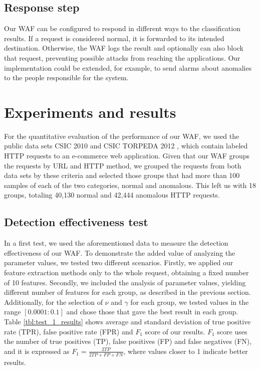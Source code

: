 \subsection{Response step}

Our WAF can be configured to respond in different ways to the classification
results. If a request is considered normal, it is forwarded to its intended
destination. Otherwise, the WAF logs the result and optionally can also
block that request, preventing possible attacks from reaching the applications.
Our implementation could be extended, for example, to send alarms about
anomalies to the people responsible for the system.


\section{Experiments and results}
\label{chap:results}

For the quantitative evaluation of the performance of our WAF, we used the
public data sets CSIC 2010 \cite{csic2010dataset} and CSIC TORPEDA 2012
\cite{torpeda2012dataset}, which contain labeled HTTP requests to an
e-commerce web application.
Given that our WAF groups the requests by URL and HTTP method, we grouped
the requests from both data sets by these criteria and selected those
groups that had more than 100 samples of each of the two categories,
normal and anomalous.
This left us with 18 groups, totaling 40,130 normal and 42,444 anomalous
HTTP requests.


\subsection{Detection effectiveness test}

In a first test, we used the aforementioned data to measure the detection
effectiveness of our WAF.
To demonstrate the added value of analyzing the parameter values, we
tested two different scenarios. Firstly, we applied our feature extraction
methods only to the whole request, obtaining a fixed number of 10 features.
Secondly, we included the analysis of parameter values, yielding different
number of features for each group, as described in the previous section.
Additionally, for the selection of $\nu$ and $\gamma$ for each group,
we tested values in the range $[0.0001: 0.1]$ and chose those that gave
the best result in each group.
Table \ref{tbl:test_1_results} shows average and standard deviation of
true positive rate (TPR), false positive rate (FPR) and $F_{1}$ score
of our results. $F_{1}$ score uses the number of true positives (TP),
false positives (FP) and false negatives (FN), and it is expressed as
$ F_{1} = \frac{2TP}{2TP + FP + FN} $,
where values closer to 1 indicate better results.

